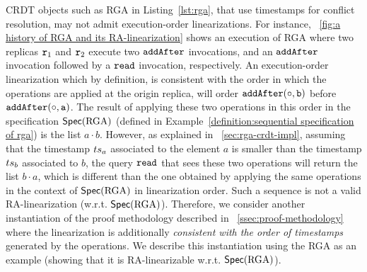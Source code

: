 CRDT objects such as RGA in Listing~\ref{lst:rga}, that use timestamps for conflict resolution, may not admit execution-order linearizations. 
For instance, \figureautorefname~\ref{fig:a history of RGA and its RA-linearization} shows an execution of RGA where two replicas $\mathtt{r}_1$ and $\mathtt{r}_2$ execute two ${\tt addAfter}$ invocations, and an ${\tt addAfter}$ invocation followed by a ${\tt read}$ invocation, respectively. An execution-order linearization which by definition, is consistent with the order in which the operations are applied at the origin replica, will order $\alabelshort[{\tt addAfter}]{\circ,b}$ before $\alabelshort[{\tt addAfter}]{\circ,a}$. The result of applying these two operations in this order in the specification $\mathsf{Spec}(\text{RGA})$ (defined in Example~\ref{definition:sequential specification of rga}) is the list $a\cdot b$. However, as explained in \sectionautorefname~\ref{sec:rga-crdt-impl}, assuming that the timestamp $ts_a$ associated to the element $a$ is smaller than the timestamp $ts_b$ associated to $b$, the query ${\tt read}$ that sees these two operations will return the list $b\cdot a$, which is different than the one obtained by applying the same operations in the context of $\mathsf{Spec}(\text{RGA})$ in linearization order. Such a sequence is not a valid RA-linearization (w.r.t. $\mathsf{Spec}(\text{RGA})$).
Therefore, we consider another instantiation of the proof methodology described in \sectionautorefname~\ref{ssec:proof-methodology} where the linearization is additionally \emph{consistent with the order of timestamps} generated by the operations.
We describe this instantiation using the RGA as an example (showing that it is RA-linearizable w.r.t. $\mathsf{Spec}(\text{RGA})$).

